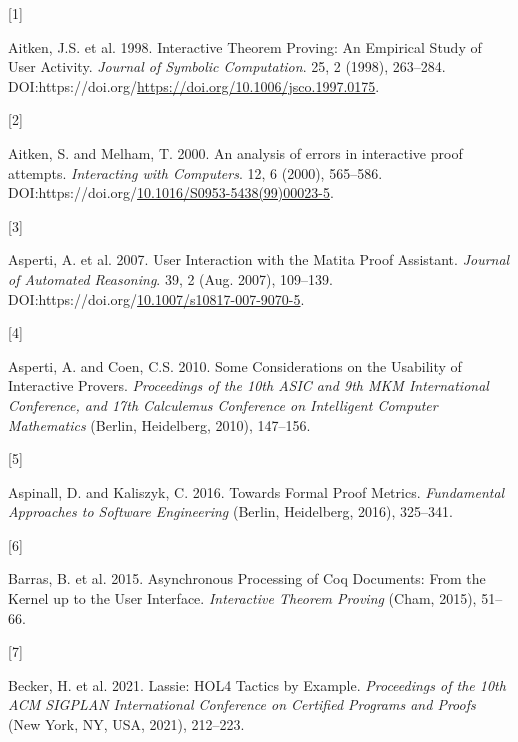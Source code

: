 \documentclass[
]{article}
\newlength{\cslhangindent}
\newlength{\csllabelwidth}
\newlength{\cslentryspacingunit} %
\newenvironment{CSLReferences}[2] %
 {%
  \setlength{\parindent}{0pt}
  \ifodd #1
  \let\oldpar\par
  \def\par{\hangindent=\cslhangindent\oldpar}
  \fi
  \setlength{\parskip}{#2\cslentryspacingunit}
 }%
 {}
\newcommand{\CSLLeftMargin}[1]{\parbox[t]{\csllabelwidth}{#1}}
\newcommand{\CSLRightInline}[1]{\parbox[t]{\linewidth - \csllabelwidth}{#1}\break}
\begin{document}
\hypertarget{refs}{}
\begin{CSLReferences}{0}{0}
\leavevmode{}%
\CSLLeftMargin{{[}1{]} }
\CSLRightInline{Aitken, J.S. et al. 1998. Interactive {Theorem}
{Proving}: {An} {Empirical} {Study} of {User} {Activity}. \emph{Journal
of Symbolic Computation}. 25, 2 (1998), 263--284.
DOI:https://doi.org/\url{https://doi.org/10.1006/jsco.1997.0175}.}

\leavevmode{}%
\CSLLeftMargin{{[}2{]} }
\CSLRightInline{Aitken, S. and Melham, T. 2000. An analysis of errors in
interactive proof attempts. \emph{Interacting with Computers}. 12, 6
(2000), 565--586.
DOI:https://doi.org/\href{https://doi.org/10.1016/S0953-5438(99)00023-5}{10.1016/S0953-5438(99)00023-5}.}

\leavevmode{}%
\CSLLeftMargin{{[}3{]} }
\CSLRightInline{Asperti, A. et al. 2007. User {Interaction} with the
{Matita} {Proof} {Assistant}. \emph{Journal of Automated Reasoning}. 39,
2 (Aug. 2007), 109--139.
DOI:https://doi.org/\href{https://doi.org/10.1007/s10817-007-9070-5}{10.1007/s10817-007-9070-5}.}

\leavevmode{}%
\CSLLeftMargin{{[}4{]} }
\CSLRightInline{Asperti, A. and Coen, C.S. 2010. Some {Considerations}
on the {Usability} of {Interactive} {Provers}. \emph{Proceedings of the
10th {ASIC} and 9th {MKM} {International} {Conference}, and 17th
{Calculemus} {Conference} on {Intelligent} {Computer} {Mathematics}}
(Berlin, Heidelberg, 2010), 147--156.}

\leavevmode{}%
\CSLLeftMargin{{[}5{]} }
\CSLRightInline{Aspinall, D. and Kaliszyk, C. 2016. Towards {Formal}
{Proof} {Metrics}. \emph{Fundamental {Approaches} to {Software}
{Engineering}} (Berlin, Heidelberg, 2016), 325--341.}

\leavevmode{}%
\CSLLeftMargin{{[}6{]} }
\CSLRightInline{Barras, B. et al. 2015. Asynchronous {Processing} of
{Coq} {Documents}: {From} the {Kernel} up to the {User} {Interface}.
\emph{Interactive {Theorem} {Proving}} (Cham, 2015), 51--66.}

\leavevmode{}%
\CSLLeftMargin{{[}7{]} }
\CSLRightInline{Becker, H. et al. 2021. Lassie: {HOL4} {Tactics} by
{Example}. \emph{Proceedings of the 10th {ACM} {SIGPLAN} {International}
{Conference} on {Certified} {Programs} and {Proofs}} (New York, NY, USA,
2021), 212--223.}


\end{CSLReferences}
\end{document}
